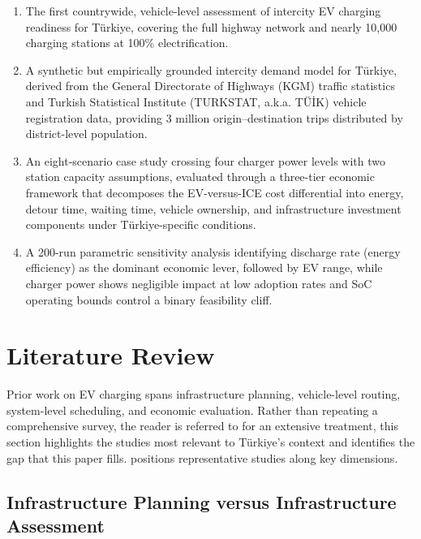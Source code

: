 \begin{enumerate}
    \item The first countrywide, vehicle-level assessment of intercity EV charging readiness for T\"{u}rkiye, covering the full highway network and nearly 10,000 charging stations at 100\% electrification.

    \item A synthetic but empirically grounded intercity demand model for T\"{u}rkiye, derived from the General Directorate of Highways (KGM) traffic statistics and Turkish Statistical Institute (TURKSTAT, a.k.a. T\"{U}\.{I}K) vehicle registration data, providing 3 million origin--destination trips distributed by district-level population.

    \item An eight-scenario case study crossing four charger power levels with two station capacity assumptions, evaluated through a three-tier economic framework that decomposes the EV-versus-ICE cost differential into energy, detour time, waiting time, vehicle ownership, and infrastructure investment components under T\"{u}rkiye-specific conditions.

    \item A 200-run parametric sensitivity analysis identifying discharge rate (energy efficiency) as the dominant economic lever, followed by EV range, while charger power shows negligible impact at low adoption rates and SoC operating bounds control a binary feasibility cliff.
\end{enumerate}

\section{Literature Review}\label{sec:lit}

Prior work on EV charging spans infrastructure planning, vehicle-level routing, system-level scheduling, and economic evaluation. Rather than repeating a comprehensive survey, the reader is referred to \citet{cokyasar2026electrification} for an extensive treatment, this section highlights the studies most relevant to T\"{u}rkiye's context and identifies the gap that this paper fills.  positions representative studies along key dimensions.

\subsection{Infrastructure Planning versus Infrastructure Assessment}

